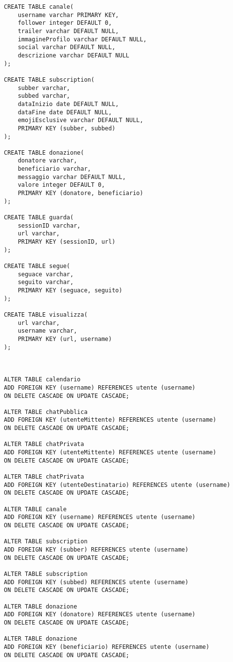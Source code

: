 \begin{lstlisting}
CREATE TABLE canale(
    username varchar PRIMARY KEY,
    follower integer DEFAULT 0,
    trailer varchar DEFAULT NULL,
    immagineProfilo varchar DEFAULT NULL,
    social varchar DEFAULT NULL,
    descrizione varchar DEFAULT NULL
);

CREATE TABLE subscription(
    subber varchar,
    subbed varchar,
    dataInizio date DEFAULT NULL,
    dataFine date DEFAULT NULL,
    emojiEsclusive varchar DEFAULT NULL,
    PRIMARY KEY (subber, subbed)
);

CREATE TABLE donazione(
    donatore varchar,
    beneficiario varchar,
    messaggio varchar DEFAULT NULL,
    valore integer DEFAULT 0,
    PRIMARY KEY (donatore, beneficiario)
);

CREATE TABLE guarda(
    sessionID varchar,
    url varchar,
    PRIMARY KEY (sessionID, url)
);

CREATE TABLE segue(
    seguace varchar,
    seguito varchar,
    PRIMARY KEY (seguace, seguito)
);

CREATE TABLE visualizza(
    url varchar,
    username varchar,
    PRIMARY KEY (url, username)
);



ALTER TABLE calendario
ADD FOREIGN KEY (username) REFERENCES utente (username) 
ON DELETE CASCADE ON UPDATE CASCADE;

ALTER TABLE chatPubblica
ADD FOREIGN KEY (utenteMittente) REFERENCES utente (username) 
ON DELETE CASCADE ON UPDATE CASCADE;

ALTER TABLE chatPrivata
ADD FOREIGN KEY (utenteMittente) REFERENCES utente (username) 
ON DELETE CASCADE ON UPDATE CASCADE;

ALTER TABLE chatPrivata
ADD FOREIGN KEY (utenteDestinatario) REFERENCES utente (username) 
ON DELETE CASCADE ON UPDATE CASCADE;

ALTER TABLE canale
ADD FOREIGN KEY (username) REFERENCES utente (username) 
ON DELETE CASCADE ON UPDATE CASCADE;

ALTER TABLE subscription
ADD FOREIGN KEY (subber) REFERENCES utente (username) 
ON DELETE CASCADE ON UPDATE CASCADE;

ALTER TABLE subscription
ADD FOREIGN KEY (subbed) REFERENCES utente (username) 
ON DELETE CASCADE ON UPDATE CASCADE;

ALTER TABLE donazione
ADD FOREIGN KEY (donatore) REFERENCES utente (username) 
ON DELETE CASCADE ON UPDATE CASCADE;

ALTER TABLE donazione
ADD FOREIGN KEY (beneficiario) REFERENCES utente (username) 
ON DELETE CASCADE ON UPDATE CASCADE;


\end{lstlisting}
